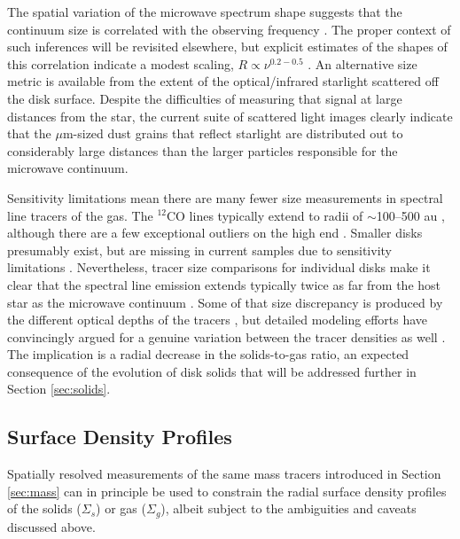 \documentclass[a4paper]{ar-1col}
\begin{document}
The spatial variation of the microwave spectrum shape suggests that the continuum size is correlated with the observing frequency \citep[e.g.,][]{perez12,lperez15,tazzari16}.  The proper context of such inferences will be revisited elsewhere, but explicit estimates of the shapes of this correlation indicate a modest scaling, $R \propto \nu^{0.2-0.5}$ \citep{tripathi18}.  An alternative size metric is available from the extent of the optical/infrared starlight scattered off the disk surface.  Despite the difficulties of measuring that signal at large distances from the star, the current suite of scattered light images clearly indicate that the $\mu$m-sized dust grains that reflect starlight are distributed out to considerably large distances than the larger particles responsible for the microwave continuum.  

Sensitivity limitations mean there are many fewer size measurements in spectral line tracers of the gas.  The $^{12}$CO lines typically extend to radii of $\sim$100--500 au \citep{ansdell18}, although there are a few exceptional outliers on the high end \citep[e.g.,][]{guilloteau98,panic09}.  Smaller disks presumably exist, but are missing in current samples due to sensitivity limitations \citep[e.g.,][]{barenfeld17_sizes}.  Nevertheless, tracer size comparisons for individual disks make it clear that the spectral line emission extends typically twice as far from the host star as the microwave continuum \citep{ansdell18}.  Some of that size discrepancy is produced by the different optical depths of the tracers \citep{hughes08,trapman19}, but detailed modeling efforts have convincingly argued for a genuine variation between the tracer densities as well \citep[e.g.,][]{panic09,andrews12,degregorio-monsalvo13,rosenfeld13b,facchini17}.  The implication is a radial decrease in the solids-to-gas ratio, an expected consequence of the evolution of disk solids that will be addressed further in Section \ref{sec:solids}.



\subsection{Surface Density Profiles} \label{sec:sigma}

Spatially resolved measurements of the same mass tracers introduced in Section \ref{sec:mass} can in principle be used to constrain the radial surface density profiles of the solids ($\Sigma_s$) or gas ($\Sigma_g$), albeit subject to the ambiguities and caveats discussed above.  
\end{document}
